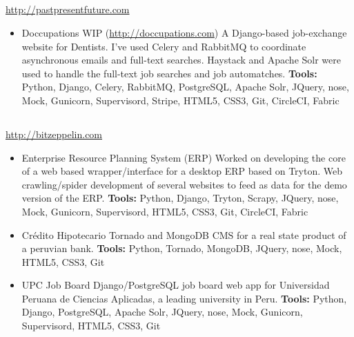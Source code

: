\documentclass[11pt,a4paper,english]{moderncv}
\begin{document}
\subsection{}

{
\url{http://pastpresentfuture.com}
\newline{}
\begin{itemize}
    \item Doccupations
        \newline{}
        WIP (\url{http://doccupations.com})
        \newline{}
        A Django-based job-exchange website for Dentists. I've used Celery and RabbitMQ to coordinate asynchronous emails and full-text searches. Haystack and Apache Solr were used to handle the full-text job searches and job automatches.
        \newline{}
        \textbf{Tools:} Python, Django, Celery, RabbitMQ, PostgreSQL, Apache Solr, JQuery, nose, Mock, Gunicorn, Supervisord, Stripe, HTML5, CSS3, Git, CircleCI, Fabric
\end{itemize}
}

\subsection{}

{
\url{http://bitzeppelin.com}
\newline{}
\begin{itemize}
    \item Enterprise Resource Planning System (ERP)
        \newline{}
	    Worked on developing the core of a web based wrapper/interface for a desktop ERP based on Tryton. Web crawling/spider development of several websites to feed as data for the demo version of the ERP.
        \newline{}
        \textbf{Tools:} Python, Django, Tryton, Scrapy, JQuery, nose, Mock, Gunicorn, Supervisord, HTML5, CSS3, Git, CircleCI, Fabric
    \item Crédito Hipotecario
        \newline{}
        Tornado and MongoDB CMS for a real state product of a peruvian bank.
        \newline{}
        \textbf{Tools:} Python, Tornado, MongoDB, JQuery, nose, Mock, HTML5, CSS3, Git
    \item UPC Job Board
        \newline{}
        Django/PostgreSQL job board web app for Universidad Peruana de Ciencias Aplicadas, a leading university in Peru.
        \newline{}
        \textbf{Tools:} Python, Django, PostgreSQL, Apache Solr, JQuery, nose, Mock, Gunicorn, Supervisord, HTML5, CSS3, Git
\end{itemize}
}
\end{document}
